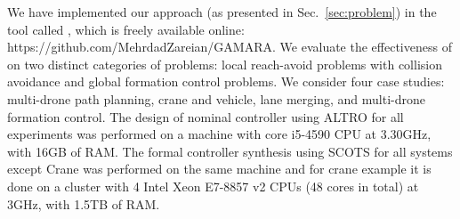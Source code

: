 We have implemented our approach (as presented in Sec.~\ref{sec:problem}) in the tool called \tool, which is freely available online: https://github.com/MehrdadZareian/GAMARA.
We evaluate the effectiveness of \tool on two distinct categories of problems: 
local reach-avoid problems with collision avoidance and global formation control problems. 
We consider four case studies: multi-drone path planning, crane and vehicle, lane merging, and multi-drone formation control. 
The design of nominal controller using ALTRO for all experiments was performed on a machine with core i5-4590 CPU at 3.30GHz, with 16GB of RAM.
The formal controller synthesis using SCOTS for all systems except Crane was performed on the same machine and for crane example it is done on a cluster with 4 Intel Xeon E7-8857 v2 CPUs (48 cores in total) at 3GHz, with 1.5TB of RAM. 

